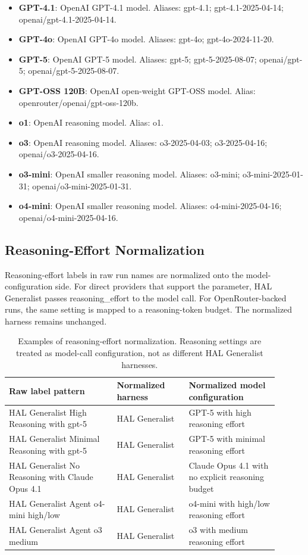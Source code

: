 \begin{itemize}
\item \textbf{GPT-4.1}: OpenAI GPT-4.1 model. Aliases: gpt-4.1; gpt-4.1-2025-04-14; openai/gpt-4.1-2025-04-14.
\item \textbf{GPT-4o}: OpenAI GPT-4o model. Aliases: gpt-4o; gpt-4o-2024-11-20.
\item \textbf{GPT-5}: OpenAI GPT-5 model. Aliases: gpt-5; gpt-5-2025-08-07; openai/gpt-5; openai/gpt-5-2025-08-07.
\item \textbf{GPT-OSS 120B}: OpenAI open-weight GPT-OSS model. Alias: openrouter/openai/gpt-oss-120b.
\item \textbf{o1}: OpenAI reasoning model. Alias: o1.
\item \textbf{o3}: OpenAI reasoning model. Aliases: o3-2025-04-03; o3-2025-04-16; openai/o3-2025-04-16.
\item \textbf{o3-mini}: OpenAI smaller reasoning model. Aliases: o3-mini; o3-mini-2025-01-31; openai/o3-mini-2025-01-31.
\item \textbf{o4-mini}: OpenAI smaller reasoning model. Aliases: o4-mini-2025-04-16; openai/o4-mini-2025-04-16.
\end{itemize}
\endgroup

\subsection{Reasoning-Effort Normalization}

Reasoning-effort labels in raw run names are normalized onto the model-configuration side. For direct providers that support the parameter, HAL Generalist passes reasoning\_effort to the model call. For OpenRouter-backed runs, the same setting is mapped to a reasoning-token budget. The normalized harness remains unchanged.

\begin{table}[h]
\centering
\small
\begin{tabular}{>{\raggedright\arraybackslash}p{0.36\linewidth}>{\raggedright\arraybackslash}p{0.24\linewidth}>{\raggedright\arraybackslash}p{0.30\linewidth}}
\toprule
Raw label pattern & Normalized harness & Normalized model configuration \\
\midrule
HAL Generalist High Reasoning with gpt-5 & HAL Generalist & GPT-5 with high reasoning effort \\
HAL Generalist Minimal Reasoning with gpt-5 & HAL Generalist & GPT-5 with minimal reasoning effort \\
HAL Generalist No Reasoning with Claude Opus 4.1 & HAL Generalist & Claude Opus 4.1 with no explicit reasoning budget \\
HAL Generalist Agent o4-mini high/low & HAL Generalist & o4-mini with high/low reasoning effort \\
HAL Generalist Agent o3 medium & HAL Generalist & o3 with medium reasoning effort \\
\bottomrule
\end{tabular}
\caption{Examples of reasoning-effort normalization. Reasoning settings are treated as model-call configuration, not as different HAL Generalist harnesses.}
\end{table}

